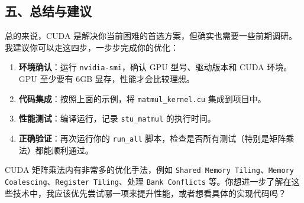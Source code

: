 \documentclass[11pt, a4paper]{article}
\begin{document}
\begin{aibox}
\subsection*{五、总结与建议}

总的来说，CUDA 是解决你当前困难的首选方案，但确实也需要一些前期调研。我建议你可以走这四步，一步步完成你的优化：

\begin{enumerate}
    \item \textbf{环境确认}：运行 \texttt{nvidia-smi}，确认 GPU 型号、驱动版本和 CUDA 环境。GPU 至少要有 6GB 显存，性能才会比较理想。
    \item \textbf{代码集成}：按照上面的示例，将 \texttt{matmul\_kernel.cu} 集成到项目中。
    \item \textbf{性能测试}：编译运行，记录 \texttt{stu\_matmul} 的执行时间。
    \item \textbf{正确验证}：再次运行你的 \texttt{run\_all} 脚本，检查是否所有测试（特别是矩阵乘法）都能顺利通过。
\end{enumerate}

CUDA 矩阵乘法内有非常多的优化手法，例如 \texttt{Shared Memory Tiling}、\texttt{Memory Coalescing}、\texttt{Register Tiling}、处理 \texttt{Bank Conflicts} 等。你想进一步了解在这些技术中，我应该优先尝试哪一项来提升性能，或者想看具体的实现代码吗？
\end{aibox}

\vspace{1.5em}
\end{document}
